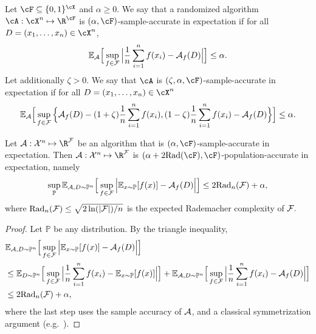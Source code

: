 \begin{definition}
\label{def:expected_sample_accuracy}
Let $\cF\subseteq\{0,1\}^{\cX}$ and $\alpha\geq 0$.
We say that a randomized algorithm $\cA:\cX^n\mapsto\R^{\cF}$ is $(\alpha,\cF)$-sample-accurate in expectation if for all $D=(x_1,\ldots,x_n)\in \cX^n$,
\[ \mathbb{E}_{\cal A}\Big[ \sup_{f\in {\cal F}} \Big|\frac1n\sum_{i=1}^n f(x_i)-{\cal A}_f(D)\Big| \Big] \leq \alpha. \]
Let additionally $\zeta>0$. We say that $\cA$ is $(\zeta,\alpha,\cF)$-sample-accurate in expectation if for all $D=(x_1,\ldots,x_n)\in \cX^n$
\[ \mathbb{E}_{\cal A}\Big[ \sup_{f\in {\cal F}} \Big\{
{\cal A}_f(D)-(1+\zeta)\frac1n\sum_{i=1}^n f(x_i),
(1-\zeta)\frac1n\sum_{i=1}^n f(x_i)-{\cal A}_f(D)\Big\} \Big] \leq \alpha. \]
\end{definition}



\begin{proposition} \label{propos:generalization_synthetic_data}
Let ${\cal A}:{\cal X}^n\mapsto \R^{\cal F}$ be an algorithm  that is $(\alpha,\cF)$-sample-accurate in expectation.
Then ${\cal A}:{\cal X}^n\mapsto \R^{\cal F}$ is $(\alpha+2\mbox{Rad}(\cF),\cF)$-population-accurate in expectation, namely
\[ \sup_{\mathbb{P}} \mathbb{E}_{{\cal A},D\sim \mathbb{P}^n}\Big[ \sup_{f\in {\cal F}} \Big|\mathbb{E}_{x\sim \mathbb{P}}[f(x)]-{\cal A}_f(D)\Big| \Big] \leq 2\mbox{Rad}_n({\cal F})+\alpha,  \]
where $\mbox{Rad}_n({\cal F})\leq \sqrt{2\ln(|{\cal F}|)/n}$ is the expected Rademacher complexity of ${\cal F}.$
\end{proposition}

\begin{proof}
Let $\mathbb{P}$ be any distribution. By the triangle inequality,
\begin{align*}
&\mathbb{E}_{{\cal A},D\sim \mathbb{P}^n}\Big[ \sup_{f\in {\cal F}} \Big|\mathbb{E}_{x\sim \mathbb{P}}[f(x)]-{\cal A}_f(D)\Big| \Big]  \\
&\leq 
\mathbb{E}_{D\sim \mathbb{P}^n}\Big[ \sup_{f\in {\cal F}} \Big|\frac1n\sum_{i=1}^n f(x_i)-\mathbb{E}_{x\sim \mathbb{P}}[f(x)]\Big| \Big] 
+ \mathbb{E}_{{\cal A},D\sim \mathbb{P}^n}\Big[ \sup_{f\in {\cal F}} \Big|\frac1n\sum_{i=1}^n f(x_i)-{\cal A}_f(D)\Big| \Big]\\
&\leq 2\mbox{Rad}_n({\cal F})+\alpha,
\end{align*}
where the last step uses the sample accuracy of ${\cal A}$, and a classical symmetrization argument (e.g.~\cite{Mohri:2018}).
\end{proof}

